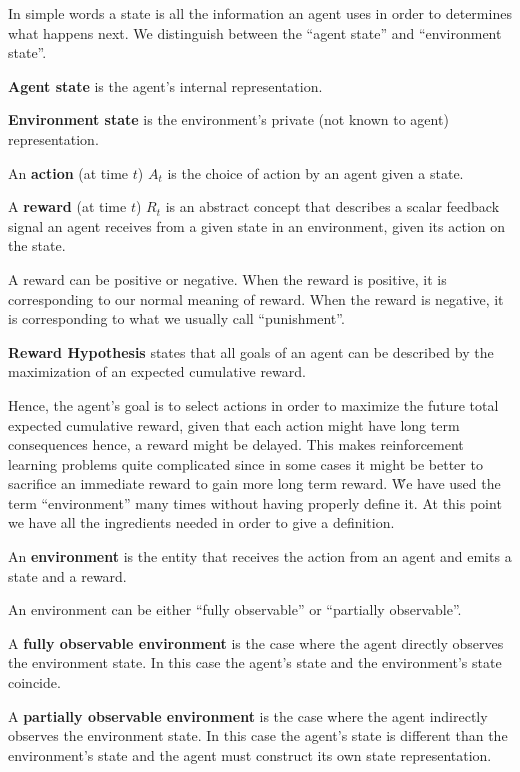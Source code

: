 In simple words a state is all the information an agent uses in order to determines what happens next. We distinguish
between the ``agent state'' and ``environment state''.

\textbf{Agent state} is the agent's internal representation.
\ed

\textbf{Environment state} is the environment's private (not known to agent) representation.
\ed

\bd[Action]
An \textbf{action} (at time $t$) $A_t$ is the choice of action by an agent
given a state.
\ed

\bd[Reward]
A \textbf{reward} (at time $t$) $R_t$ is an abstract concept that describes
a scalar feedback signal an agent
receives from a given state in an environment, given its action on the state.
\ed

A reward can be positive or negative. When the reward is positive, it is corresponding to our normal meaning of 
reward. When the reward is negative, it is corresponding to what we usually call ``punishment''.

\textbf{Reward Hypothesis} states that all goals of an agent can be described by the maximization of an expected 
cumulative reward. 
\ed

Hence, the agent's goal is to select actions in order to maximize the future total expected cumulative reward, given
that each action might have long term consequences hence, a reward might be delayed. This makes reinforcement learning
problems quite complicated since in some cases it might be better to sacrifice an immediate reward to gain more long 
term reward. \v

We have used the term ``environment'' many times without having properly define it. At this point we have all the 
ingredients needed in order to give a definition.

\bd[Environment]
An \textbf{environment} is the entity that receives the action from an agent and emits a state and a reward.
\ed

An environment can be either ``fully observable'' or ``partially observable''.

A \textbf{fully observable environment} is the case where the agent directly observes the environment state. In this 
case the agent's state and the environment's state coincide. 
\ed

A \textbf{partially observable environment} is the case where the agent indirectly observes the environment state. 
In this case the agent's state is different than the environment's state and the agent must construct its own state 
representation. 
\ed

